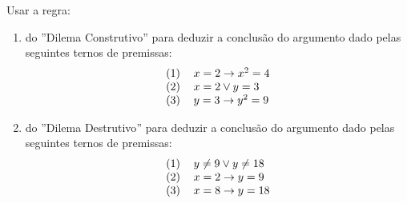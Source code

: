 \item Usar a regra:
	\begin{enumerate}
\item
		do ''{\sc Dilema Construtivo}'' para deduzir a conclusão do argumento dado pelas seguintes ternos de premissas:
\[
				\begin{tabular}{ll}
						$(1)$ & $x=2 \rightarrow x^2= 4$ \\
						$(2)$ & $x=2 \vee y= 3$ \\
						$(3)$ & $y=3 \rightarrow y^2= 9$ 
				\end{tabular}
\]		

\item
		do ''{\sc Dilema Destrutivo}'' para deduzir a conclusão do argumento dado pelas
seguintes ternos de premissas:
\[
				\begin{tabular}{ll}
						$(1)$ & $y\neq 9 \vee y\neq 18$ \\
						$(2)$ & $x=2 \rightarrow y= 9$ \\
						$(3)$ & $x=8 \rightarrow y= 18$ 
				\end{tabular}
\]
	\end{enumerate}
